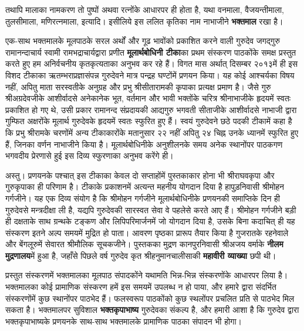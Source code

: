 \begin{sloppypar}\justifying{}
तथापि मालाका नामकरण तो पुष्पों अथवा रत्नोंके आधारपर ही होता है, यथा वनमाला, वैजयन्तीमाला, तुलसीमाला, मणिरत्नमाला, इत्यादि। इसीलिये इस ललित कृतिका नाम नाभाजीने \textbf{भक्तमाल} रखा है।
\end{sloppypar}
\begin{sloppypar}\justifying{}
एक-साथ भक्तमालके मूलपाठके सरल अर्थों और गूढ भावोंको प्रकाशित करने वाली गुरुदेव जगद्गुरु रामानन्दाचार्य स्वामी रामभद्राचार्यद्वारा प्रणीत \textbf{मूलार्थबोधिनी टीका}का प्रथम संस्करण पाठकोंके समक्ष प्रस्तुत करते हुए हम अनिर्वचनीय कृतकृत्यताका अनुभव कर रहे हैं। विगत मास अर्थात् दिसम्बर २०१३में ही इस विशद टीकाका ऋतम्भराप्रज्ञासंपन्न गुरुदेवने मात्र पन्द्रह घण्टोंमें प्रणयन किया। यह कोई आश्चर्यका विषय नहीं, अपितु माता सरस्वतीके अनुग्रह और प्रभु श्रीसीतारामकी कृपाका प्रत्यक्ष प्रमाण है। जैसे गुरु श्रीअग्रदेवजीके आशीर्वादसे अनेकानेक भूत, वर्तमान और भावी भक्तोंके चरित्र श्रीनाभाजीके हृदयमें स्वतः प्रकाशित हो गए थे, उसी प्रकार रामानन्द संप्रदायकी आद्यगुरु भगवती सीताजीके आशीर्वादसे नाभाजी द्वारा गुम्फित अक्षरोंके मूलार्थ गुरुदेवके हृदयमें स्वतः स्फुरित हुए हैं। स्वयं गुरुदेवने छठे पदकी टीकामें कहा है कि प्रभु श्रीरामके चरणोंमें अन्य टीकाकारोंके मतानुसार २२ नहीं अपितु २४ चिह्न उनके ध्यानमें स्फुरित हुए हैं, जिनका वर्णन नाभाजीने किया है। मूलार्थबोधिनीके अनुशीलनके समय अनेक स्थानोंपर पाठकगण भगवदीय प्रेरणासे हुई इस दिव्य स्फुरणाका अनुभव करेंगे ही।
\end{sloppypar}
\begin{sloppypar}\justifying{}
अस्तु। प्रणयनके पश्चात् इस टीकाका केवल दो सप्ताहोंमें पुस्तकाकार होना भी श्रीराघवकृपा और गुरुकृपाका ही परिणाम है। टीकाके प्रकाशनमें अत्यन्त महनीय योगदान दिया है हापुड़निवासी श्रीमोहन गर्गजीने। यह एक दिव्य संयोग है कि श्रीमोहन गर्गजीने मूलार्थबोधिनीके प्रणयनकी समाप्तिके दिन ही गुरुदेवसे मन्त्रदीक्षा ली है, यद्यपि गुरुदेवकी सारस्वत सेवा वे पहलेसे करते आए हैं। श्रीमोहन गर्गजीने बड़ी ही दक्षताके साथ ग्रन्थके टङ्कण और लिपिपरिमार्जनमें जो योगदान दिया है, उसके बिना कदाचित् ही यह संस्करण इतने अल्प समयमें मुद्रित हो पाता। आवरण पृष्ठका प्रारूप तैयार किया है गुजरातके रहनेवाले और बेंगलूरुमें सेवारत श्रीमौलिक सूचकजीने। पुस्तकका मुद्रण कानपुरनिवासी श्रीअजय वर्माके \textbf{नीलम मुद्रणालय}में हुआ है, जहाँसे पिछले वर्ष गुरुदेव कृत श्रीहनुमानचालीसाकी \textbf{महावीरी व्याख्या} छपी थी।
\end{sloppypar}
\begin{sloppypar}\justifying{}
प्रस्तुत संस्करणमें भक्तमालका मूलपाठ संपादकोंने यथामति भिन्न-भिन्न संस्करणोंके आधारपर लिया है। भक्तमालका कोई प्रामाणिक संस्करण हमें इस समयमें उपलब्ध न हो पाया, और हमारे द्वारा संदर्भित संस्करणोंमें कुछ स्थानोंपर पाठभेद हैं। फलस्वरूप पाठकोंको कुछ स्थलोंपर प्रचलित प्रति से पाठभेद मिल सकता है। भक्तमालपर सुविशाल \textbf{भक्तकृपाभाष्य} गुरुदेवका संकल्प है, और हमारी आशा है कि गुरुदेव द्वारा भक्तकृपाभाष्यके प्रणयनके साथ-साथ भक्तमालके प्रामाणिक पाठका संपादन भी होगा।
\end{sloppypar}
